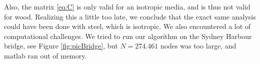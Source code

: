 Also, the matrix \eqref{eq:C} is only valid for an isotropic media, and is thus not valid for wood. Realizing this a little too late, we conclude that the exact same analysis could have been done with steel, which is isotropic. We also encountered a lot of computational challenges. We tried to run our algorithm on the Sydney Harbour bridge, see Figure \ref{fig:picBridge}, but $N = 274.461$ nodes was too large, and matlab ran out of memory. 
